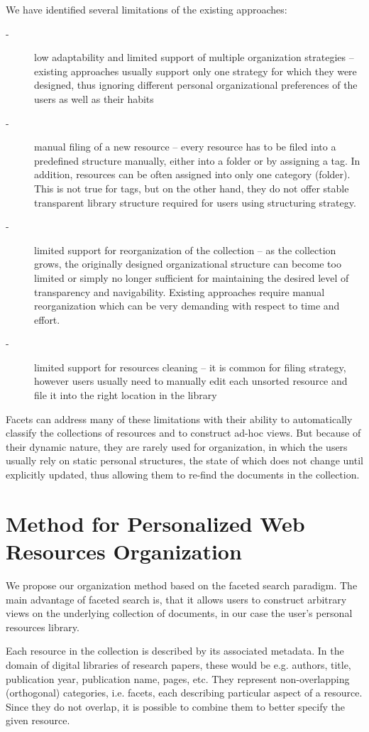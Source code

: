 \documentclass{article}
\begin{document}
  We have identified several limitations of the existing approaches: 
  
\begin{description}
\item[-]  low adaptability and limited support of multiple organization strategies – existing approaches usually support only one strategy for which they were designed, thus ignoring different personal organizational preferences of the users as well as their habits
\item[-] manual filing of a new resource – every resource has to be filed into a predefined structure manually, either into a folder or by assigning a tag. In addition, resources can be often assigned into only one category (folder). This is not true for tags, but on the other hand, they do not offer stable transparent library structure required for users using structuring strategy.
\item[-]limited support for reorganization of the collection – as the collection grows, the originally designed organizational structure can become too limited or simply no longer sufficient for maintaining the desired level of transparency and navigability. Existing approaches require manual reorganization which can be very demanding with respect to time and effort. 
\item[-] limited support for resources cleaning – it is common for filing strategy, however users usually need to manually edit each unsorted resource and file it into the right location in the library
\end{description}
Facets can address many of these limitations with their ability to automatically classify the collections of resources and to construct ad-hoc views. But because of their dynamic nature, they are rarely used for organization, in which the users usually rely on static personal structures, the state of which does not change until explicitly updated, thus allowing them to re-find the documents in the collection.
\section{Method for Personalized Web Resources Organization }
We propose our organization method based on the faceted search paradigm. The main advantage of faceted search is, that it allows users to construct arbitrary views on the underlying collection of documents, in our case the user’s personal resources library. 

Each resource in the collection is described by its associated metadata. In the domain of digital libraries of research papers, these would be e.g. authors, title, publication year, publication name, pages, etc. They represent non-overlapping (orthogonal) categories, i.e. facets, each describing particular aspect of a resource. Since they do not overlap, it is possible to combine them to better specify the given resource. 
\end{document}
